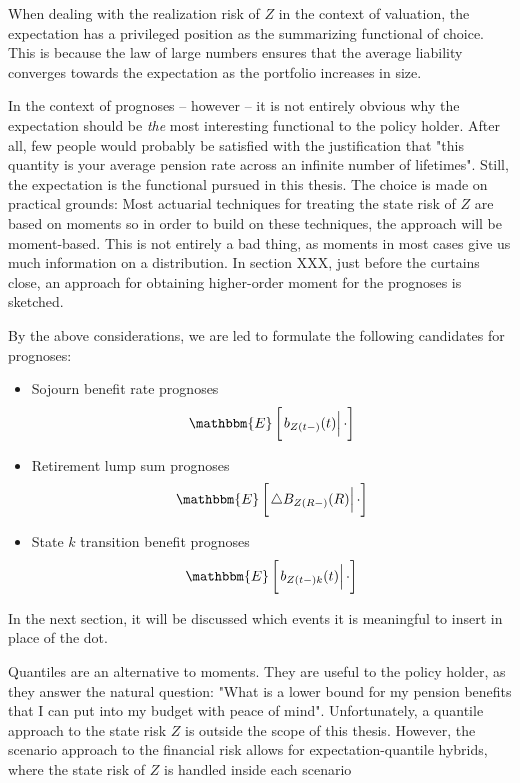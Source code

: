 \documentclass{book}
\newcommand{\1}[1]{\mathbbm{1}_{\left\lbrace #1 \right\rbrace}}
\newcommand{\econd}[2][def]{\mathbbm{E} \left[ \left. #1 \right| #2 \right]}
\theoremstyle{break}
\theoremstyle{remark}
\newenvironment{remark}
  {\pushQED{\qed}\renewcommand{\qedsymbol}{\scalebox{1.4}{$\circ$}}\remarkx}
  {\popQED\endremarkx}
\numberwithin{equation}{section}
\begin{document}
When dealing with the realization risk of $Z$ in the context of valuation, the expectation has a privileged position as the summarizing functional of choice. This is because the law of large numbers ensures that the average liability converges towards the expectation as the portfolio increases in size.

In the context of prognoses -- however -- it is not entirely obvious why the expectation should be \textit{the} most interesting functional to the policy holder. After all, few people would probably be satisfied with the justification that "this quantity is your average pension rate across an infinite number of lifetimes". Still, the expectation is the functional pursued in this thesis. The choice is made on practical grounds: Most actuarial techniques for treating the state risk of $Z$ are based on moments so in order to build on these techniques, the approach will be moment-based. This is not entirely a bad thing, as moments in most cases give us much information on a distribution. In section XXX, just before the curtains close, an approach for obtaining higher-order moment for the prognoses is sketched.

By the above considerations, we are led to formulate the following candidates for prognoses:

\begin{itemize}
    \item Sojourn benefit rate prognoses
    \begin{align*}
        \econd[b_{Z(t-)}(t)]{\cdot}
    \end{align*}
    \item Retirement lump sum prognoses
    \begin{align*}
        \econd[\triangle B_{Z(R-)}(R)]{\cdot}
    \end{align*}
    \item State $k$ transition benefit prognoses
    \begin{align*}
        \econd[b_{Z(t-)k}(t)]{\cdot}
    \end{align*}
\end{itemize}

In the next section, it will be discussed which events it is meaningful to insert in place of the dot.

\begin{remark}
	Quantiles are an alternative to moments. They are useful to the policy holder, as they answer the natural question: "What is a lower bound for my pension benefits that I can put into my budget with peace of mind". Unfortunately, a quantile approach to the state risk $Z$ is outside the scope of this thesis. However, the scenario approach to the financial risk allows for expectation-quantile hybrids, where the state risk of $Z$ is handled inside each scenario
\end{remark}
\end{document}
